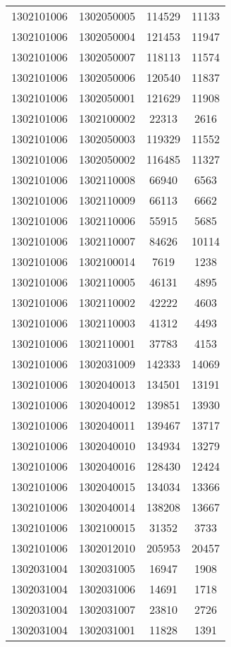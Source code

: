 \begin{longtable}[h]{llcc}
		1302101006 & 1302050005 & 114529 & 11133\\
		1302101006 & 1302050004 & 121453 & 11947\\
		1302101006 & 1302050007 & 118113 & 11574\\
		1302101006 & 1302050006 & 120540 & 11837\\
		1302101006 & 1302050001 & 121629 & 11908\\
		1302101006 & 1302100002 & 22313 & 2616\\
		1302101006 & 1302050003 & 119329 & 11552\\
		1302101006 & 1302050002 & 116485 & 11327\\
		1302101006 & 1302110008 & 66940 & 6563\\
		1302101006 & 1302110009 & 66113 & 6662\\
		1302101006 & 1302110006 & 55915 & 5685\\
		1302101006 & 1302110007 & 84626 & 10114\\
		1302101006 & 1302100014 & 7619 & 1238\\
		1302101006 & 1302110005 & 46131 & 4895\\
		1302101006 & 1302110002 & 42222 & 4603\\
		1302101006 & 1302110003 & 41312 & 4493\\
		1302101006 & 1302110001 & 37783 & 4153\\
		1302101006 & 1302031009 & 142333 & 14069\\
		1302101006 & 1302040013 & 134501 & 13191\\
		1302101006 & 1302040012 & 139851 & 13930\\
		1302101006 & 1302040011 & 139467 & 13717\\
		1302101006 & 1302040010 & 134934 & 13279\\
		1302101006 & 1302040016 & 128430 & 12424\\
		1302101006 & 1302040015 & 134034 & 13366\\
		1302101006 & 1302040014 & 138208 & 13667\\
		1302101006 & 1302100015 & 31352 & 3733\\
		1302101006 & 1302012010 & 205953 & 20457\\
		1302031004 & 1302031005 & 16947 & 1908\\
		1302031004 & 1302031006 & 14691 & 1718\\
		1302031004 & 1302031007 & 23810 & 2726\\
		1302031004 & 1302031001 & 11828 & 1391\\

\end{longtable}
